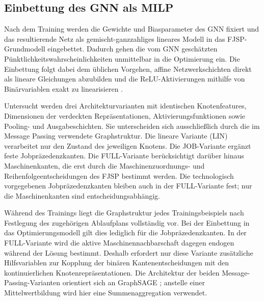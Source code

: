 \subsection{Einbettung des GNN als MILP}
\label{sec:gnn-milp-einbettung}

Nach dem Training werden die Gewichte und Biasparameter des GNN fixiert und
das resultierende Netz als gemischt-ganzzahliges lineares Modell in das
FJSP-Grundmodell eingebettet. Dadurch gehen die vom GNN geschätzten
Pünktlichkeitswahrscheinlichkeiten unmittelbar in die Optimierung ein. Die
Einbettung folgt dabei dem üblichen Vorgehen, affine Netzwerkschichten direkt
als lineare Gleichungen abzubilden und die ReLU-Aktivierungen mithilfe von
Binärvariablen exakt zu linearisieren \cite{anderson2020strong}.

Untersucht werden drei Architekturvarianten mit identischen Knotenfeatures,
Dimensionen der verdeckten Repräsentationen, Aktivierungsfunktionen sowie
Pooling- und Ausgabeschichten. Sie unterscheiden sich ausschließlich durch
die im Message Passing verwendete Graphstruktur. Die lineare Variante (LIN)
verarbeitet nur den Zustand des jeweiligen Knotens. Die JOB-Variante ergänzt feste
Jobpräzedenzkanten. Die FULL-Variante berücksichtigt darüber hinaus
Maschinenkanten, die erst durch die Maschinenzuordnungs- und
Reihenfolgeentscheidungen des FJSP bestimmt werden. Die technologisch
vorgegebenen Jobpräzedenzkanten bleiben auch in der FULL-Variante fest; nur die
Maschinenkanten sind entscheidungsabhängig.

Während des Trainings liegt die Graphstruktur jedes Trainingsbeispiels nach
Festlegung des zugehörigen Ablaufplans vollständig vor. Bei der Einbettung in
das Optimierungsmodell gilt dies lediglich für die Jobpräzedenzkanten. In der
FULL-Variante wird die aktive Maschinennachbarschaft dagegen endogen während
der Lösung bestimmt. Deshalb erfordert nur diese Variante zusätzliche
Hilfsvariablen zur Kopplung der binären Kantenentscheidungen mit den
kontinuierlichen Knotenrepräsentationen. Die Architektur der beiden
Message-Passing-Varianten orientiert sich an GraphSAGE
\cite{hamilton2017inductive}; anstelle einer Mittelwertbildung wird hier eine
Summenaggregation verwendet.

